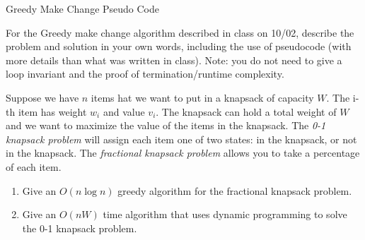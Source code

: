 \documentclass{article}
\begin{document}
\begin{algorithm}
    \caption{Greedy Make Change Pseudo Code}
    \begin{algorithmic}
            \State $result\_list$ = []
                \State return $result\_list$
            \EndIf
            
        \State sort(currency\_list, LARGE\_TO\_SMALL) 
        
                \State $result\_list.append(currency\_list[i])$  $remaining\_change$}
                \State $remaining\_change$ $-=$ currency\_list[i].value()
                \State Break
            \EndIf
        \EndFor
        
        \State $result\_list$.concatenate($Greedy\_Make\_Change(currency\_list$, $remaining\_changes)$)
        
        \State \textbf{return} result\_list
        \EndProcedure
    \end{algorithmic}
\end{algorithm}

\nextprob
For the Greedy make change algorithm described in class on 10/02, describe the
problem and solution in your own words, including the use of pseudocode (with
more details than what was written in class).  Note: you do not need to give a
loop invariant and the proof of termination/runtime complexity.

\nextprob
Suppose we have $n$ items hat we want to put in a knapsack of capacity $W$.  The i-th item has
weight $w_i$ and value $v_i$.  The knapsack can hold a total weight of $W$ and
we want to maximize the value of the items in the knapsack.
The \emph{0-1 knapsack problem} will assign each item one of two states: in the
knapsack, or not in the knapsack.  The \emph{fractional knapsack problem} allows
you to take a percentage of each item.
\begin{enumerate}
    \item Give an $O(n\log n)$ greedy algorithm for the fractional knapsack problem.
    \item Give an $O(nW)$ time algorithm that uses dynamic programming to solve
        the 0-1 knapsack problem.
\end{enumerate}
\end{document}
